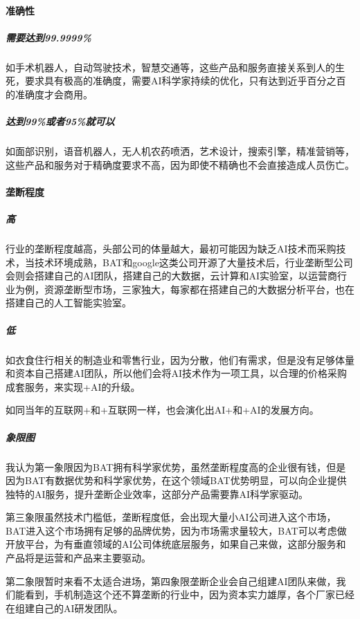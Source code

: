 \documentclass[letterpaper,11pt,english]{sphinxmanual}
\begin{document}
\paragraph{准确性}
\label{\detokenize{chapter_project/AI_industry_analysis:id2}}

\subparagraph{需要达到99.9999\%}
\label{\detokenize{chapter_project/AI_industry_analysis:id3}}
如手术机器人，自动驾驶技术，智慧交通等，这些产品和服务直接关系到人的生死，要求具有极高的准确度，需要AI科学家持续的优化，只有达到近乎百分之百的准确度才会商用。


\subparagraph{达到99\%或者95\%就可以}
\label{\detokenize{chapter_project/AI_industry_analysis:id4}}
如面部识别，语音机器人，无人机农药喷洒，艺术设计，搜索引擎，精准营销等，这些产品和服务对于精确度要求不高，因为即使不精确也不会直接造成人员伤亡。


\paragraph{垄断程度}
\label{\detokenize{chapter_project/AI_industry_analysis:id5}}

\subparagraph{高}
\label{\detokenize{chapter_project/AI_industry_analysis:id6}}
行业的垄断程度越高，头部公司的体量越大，最初可能因为缺乏AI技术而采购技术，当技术环境成熟，BAT和google这类公司开源了大量技术后，行业垄断型公司会则会搭建自己的AI团队，搭建自己的大数据，云计算和AI实验室，以运营商行业为例，资源垄断型市场，三家独大，每家都在搭建自己的大数据分析平台，也在搭建自己的人工智能实验室。


\subparagraph{低}
\label{\detokenize{chapter_project/AI_industry_analysis:id7}}
如衣食住行相关的制造业和零售行业，因为分散，他们有需求，但是没有足够体量和资本自己搭建AI团队，所以他们会将AI技术作为一项工具，以合理的价格采购成套服务，来实现+AI的升级。

如同当年的互联网+和+互联网一样，也会演化出AI+和+AI的发展方向。


\subparagraph{象限图}
\label{\detokenize{chapter_project/AI_industry_analysis:id8}}
我认为第一象限因为BAT拥有科学家优势，虽然垄断程度高的企业很有钱，但是因为BAT有数据优势和科学家优势，在这个领域BAT优势明显，可以向企业提供独特的AI服务，提升垄断企业效率，这部分产品需要靠AI科学家驱动。

第三象限虽然技术门槛低，垄断程度低，会出现大量小AI公司进入这个市场，BAT进入这个市场拥有足够的品牌优势，因为市场需求量较大，BAT可以考虑做开放平台，为有垂直领域的AI公司体统底层服务，如果自己来做，这部分服务和产品将是运营和产品来主要驱动。

第二象限暂时来看不太适合进场，第四象限垄断企业会自己组建AI团队来做，我们能看到，手机制造这个还不算垄断的行业中，因为资本实力雄厚，各个厂家已经在组建自己的AI研发团队。
\end{document}
